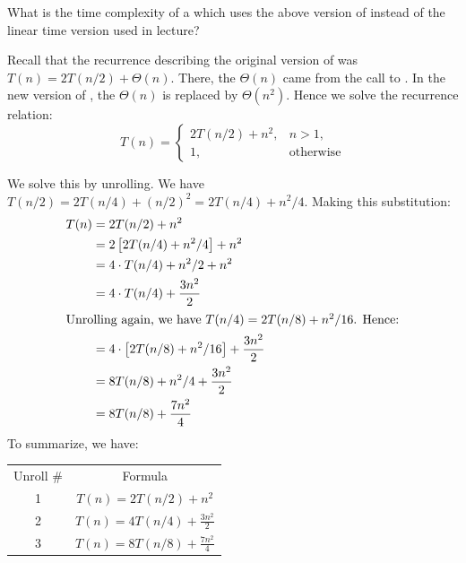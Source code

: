 \begin{prob}
\begin{subprobset}
        \begin{subprob}
            What is the time complexity of a  which uses the
            above version of  instead of the linear time version
            used in lecture?

            \begin{soln}
                Recall that the recurrence describing the original version of
                 was $T(n) = 2 T(n/2) + \Theta(n)$. There,
                the $\Theta(n)$ came from the call to . In the
                new version of , the $\Theta(n)$ is replaced
                by $\Theta(n^2)$. Hence we solve the recurrence relation:
                \[
                    T(n) =
                    \begin{cases}
                        2 T(n/2) + n^2, & \text{$n > 1$},\\
                        1,              & \text{otherwise}
                    \end{cases}
                \]

                We solve this by unrolling. We have $T(n/2) = 2 T(n/4) +
                (n/2)^2 = 2 T(n/4) + n^2/4$. Making this substitution:
                \begin{align*}
                    T(n) 
                        &= 2 T(n/2) + n^2\\
                        &= 2 \left[ 2 T(n/4) + n^2/4 \right] + n^2\\
                        &= 4 \cdot T(n/4) + n^2/2 + n^2\\
                        &= 4 \cdot T(n/4) + \frac{3n^2}{2}\\
                    \intertext{Unrolling again, we have $T(n/4) = 2 T(n/8) + n^2/16$. Hence:}
                        &= 4 \cdot \left[
                                2 T(n/8) + n^2 / 16
                            \right]
                            + \frac{3n^2}{2}\\
                        &=
                            8 T(n/8) + n^2/4 + \frac{3n^2}{2}\\
                        &=
                        8 T(n/8) + \frac{7n^2}{4}
                \end{align*}
                To summarize, we have:

                \begin{tabular}{cc}
                    Unroll \# & Formula\\
                    1   & $T(n) = 2 T(n/2) + n^2$\\
                    2   & $T(n) = 4 T(n/4) + \frac{3n^2}{2}$\\
                    3   & $T(n) = 8 T(n/8) + \frac{7n^2}{4}$\\
                \end{tabular}


\end{soln}
\end{subprob}
\end{subprobset}
\end{prob}
